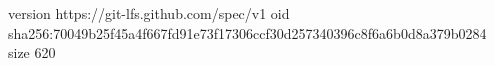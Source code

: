 version https://git-lfs.github.com/spec/v1
oid sha256:70049b25f45a4f667fd91e73f17306ccf30d257340396c8f6a6b0d8a379b0284
size 620

